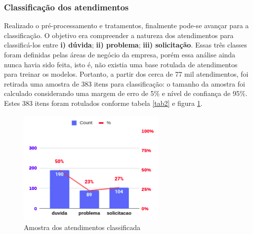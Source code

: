 \documentclass[twocolumn]{rbef}
\newcommand{\1}{\mathbbm{1}}
\begin{document}
\subsubsection{Classificação dos atendimentos} \label{Sessao4.2.2}
Realizado o pré-processamento e tratamentos, finalmente pode-se avançar para a classificação. O objetivo era compreender a natureza dos atendimentos para classificá-los entre \textbf{i) dúvida}; \textbf{ii) problema}; \textbf{iii) solicitação}. Essas três classes foram definidas pelas áreas de negócio da empresa, porém essa análise ainda nunca havia sido feita, isto é, não existia uma base rotulada de atendimentos para treinar os modelos. Portanto, a partir dos cerca de 77 mil atendimentos, foi retirada uma amostra de 383 itens para classificação: o tamanho da amostra foi calculado considerando uma margem de erro de 5\% e nível de confiança de 95\%. Estes 383 itens foram rotulados conforme tabela \ref{tab2} e figura \ref{fig6}.
\begin{table}[!htb]
\caption{Amostra dos atendimentos}
\label{tab2}
\end{table}
\begin{figure}[!htb]
  \centering \includegraphics[scale=0.7]{6. Amostra classificada atendimentos.png}
  \caption{Amostra dos atendimentos classificada}
  \label{fig6}
\end{figure}
\end{document}
